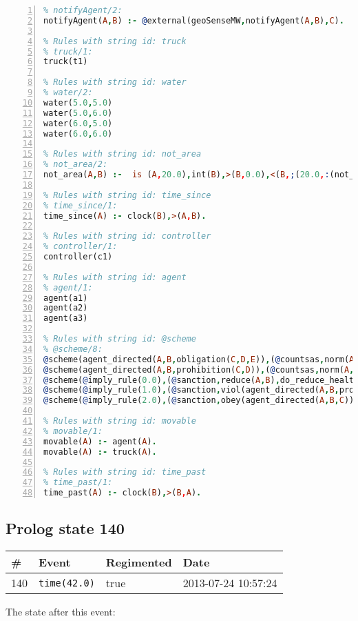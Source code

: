 \documentclass[11pt]{article}\usepackage[utf8]{inputenc}\usepackage{geometry}
\begin{document}
\begin{lstlisting}[language=Prolog, numbers=left]
% Rules with string id: notifyAgent
% notifyAgent/2:
notifyAgent(A,B) :- @external(geoSenseMW,notifyAgent(A,B),C).

% Rules with string id: truck
% truck/1:
truck(t1)

% Rules with string id: water
% water/2:
water(5.0,5.0)
water(5.0,6.0)
water(6.0,5.0)
water(6.0,6.0)

% Rules with string id: not_area
% not_area/2:
not_area(A,B) :-  is (A,20.0),int(B),>(B,0.0),<(B,;(20.0,:(not_area(A,B), is (-(B),20.0)))),int(A),>(A,0.0),<(A,;(20.0,:(area(A,B),-(int(A))))),int(B),>(A,0.0),>(B,0.0),<(A,21.0),<(B,21.0).

% Rules with string id: time_since
% time_since/1:
time_since(A) :- clock(B),>(A,B).

% Rules with string id: controller
% controller/1:
controller(c1)

% Rules with string id: agent
% agent/1:
agent(a1)
agent(a2)
agent(a3)

% Rules with string id: @scheme
% @scheme/8:
@scheme(agent_directed(A,B,obligation(C,D,E)),(@countsas,norm(A,B,F,obligation(C,D,E)),F),false,(listTrue(C)),(time_past(D)),false,[plus(viol(agent_directed(A,B,obligation(C,D,E))))|[]],[plus(obey(agent_directed(A,B,obligation(C,D,E))))|[]])
@scheme(agent_directed(A,B,prohibition(C,D)),(@countsas,norm(A,B,E,prohibition(C,D)),E),(listTrue(C)),false,(false),false,[plus(viol(agent_directed(A,B,prohibition(C,D))))|[]],[plus(obey(agent_directed(A,B,prohibition(C,D))))|[]])
@scheme(@imply_rule(0.0),(@sanction,reduce(A,B),do_reduce_health(A,B),notifyAgent(A,changed(status))),true,false,false,false,[min(reduce(A,B))|[]],[])
@scheme(@imply_rule(1.0),(@sanction,viol(agent_directed(A,B,prohibition(C,D))),do_sanction(D)),true,false,false,false,[min(viol(agent_directed(A,B,prohibition(C,D))))|[]],[])
@scheme(@imply_rule(2.0),(@sanction,obey(agent_directed(A,B,C))),true,false,false,false,[min(obey(agent_directed(A,B,C)))|[]],[])

% Rules with string id: movable
% movable/1:
movable(A) :- agent(A).
movable(A) :- truck(A).

% Rules with string id: time_past
% time_past/1:
time_past(A) :- clock(B),>(B,A).

\end{lstlisting}
\clearpage 
\subsection{Prolog state 140}
\begin{table}[ht]
\centering 
\begin{tabular}{l l l l} 
\textbf{\#} & \textbf{Event} & \textbf{Regimented} & \textbf{Date} \\ [0.5ex] 
\hline
140&\texttt{time(42.0)}&true&2013-07-24 10:57:24\\ [1ex] \hline\end{tabular}
\end{table}
The state after this event:
\end{document}

